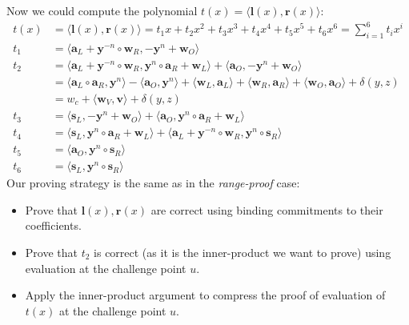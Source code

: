 \documentclass[../lecture-notes-148x210.tex]{subfiles}
\begin{document}
Now we could compute the polynomial $t(x) = \langle \mathbf{l}(x), \mathbf{r}(x) \rangle$:
\begin{equation}
    \begin{aligned}
        t(x) &= \langle \mathbf{l}(x), \mathbf{r}(x) \rangle = t_1 x + t_2 x^2 + t_3 x^3 + t_4 x^4 + t_5 x^5 + t_6 x^6 = \sum_{i=1}^{6} t_i x^i \\
        t_1 &= \langle \mathbf{a}_L + \mathbf{y}^{-n} \circ \mathbf{w}_R, - \mathbf{y}^n + \mathbf{w}_O \rangle \\
        t_2 &= \langle \mathbf{a}_L + \mathbf{y}^{-n} \circ \mathbf{w}_R, \mathbf{y}^n \circ \mathbf{a}_R + \mathbf{w}_L \rangle + \langle \mathbf{a}_O, -\mathbf{y}^n + \mathbf{w}_O \rangle  \\
        &= \langle \mathbf{a}_L \circ \mathbf{a}_R, \mathbf{y}^n \rangle - \langle \mathbf{a}_O, \mathbf{y}^n \rangle + \langle \mathbf{w}_L, \mathbf{a}_L \rangle + \langle \mathbf{w}_R, \mathbf{a}_R \rangle + \langle \mathbf{w}_O, \mathbf{a}_O \rangle + \delta(y, z) \\
        &= w_c + \langle \mathbf{w}_V, \mathbf{v} \rangle + \delta(y, z) \\
        t_3 &= \langle \mathbf{s}_L, - \mathbf{y}^n + \mathbf{w}_O \rangle + \langle \mathbf{a}_O, \mathbf{y}^n \circ \mathbf{a}_R + \mathbf{w}_L \rangle \\
        t_4 &= \langle \mathbf{s}_L, \mathbf{y}^n \circ \mathbf{a}_R +  \mathbf{w}_L \rangle + \langle \mathbf{a}_L + \mathbf{y}^{-n} \circ \mathbf{w}_R, \mathbf{y}^n \circ \mathbf{s}_R \rangle \\
        t_5 &= \langle \mathbf{a}_O, \mathbf{y}^n \circ \mathbf{s}_R \rangle \\
        t_6 &= \langle \mathbf{s}_L, \mathbf{y}^n \circ \mathbf{s}_R \rangle
    \end{aligned}
    \label{eq:inner-product-circuit-polynomials-product}
\end{equation}
Our proving strategy is the same as in the \textit{range-proof} case:
\begin{itemize}
    \item Prove that $\mathbf{l}(x), \mathbf{r}(x)$ are correct using binding commitments to their coefficients.
    \item Prove that $t_2$ is correct (as it is the inner-product we want to prove) using evaluation at the challenge point $u$.
    \item Apply the inner-product argument to compress the proof of evaluation of $t(x)$ at the challenge point $u$.
\end{itemize}
\end{document}
